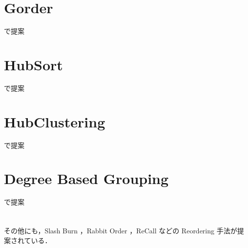 \section{Gorder}
\cite{wei2016speedup}で提案
\section{HubSort}
\cite{zhang2017making}で提案
\section{HubClustering}
\cite{balaji2018graph}で提案
\section{Degree Based Grouping}
\cite{faldu2019closer}で提案

\section*{}
その他にも，Slash Burn \cite{kang2011beyond}，Rabbit Order \cite{arai2016rabbit}，ReCall \cite{lakhotia2017recall}などの Reordering 手法が提案されている．
\cite{stanton2012streaming, karypis1998multilevelk}